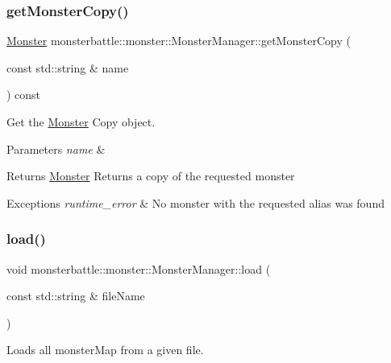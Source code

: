 \subsubsection{\texorpdfstring{get\+Monster\+Copy()}{getMonsterCopy()}}
{\footnotesize\ttfamily \hyperlink{classmonsterbattle_1_1monster_1_1Monster}{Monster} monsterbattle\+::monster\+::\+Monster\+Manager\+::get\+Monster\+Copy (\begin{DoxyParamCaption}\item[{const std\+::string \&}]{name }\end{DoxyParamCaption}) const}



Get the \hyperlink{classmonsterbattle_1_1monster_1_1Monster}{Monster} Copy object. 


\begin{DoxyParams}{Parameters}
{\em name} & \\
\hline
\end{DoxyParams}
\begin{DoxyReturn}{Returns}
\hyperlink{classmonsterbattle_1_1monster_1_1Monster}{Monster} Returns a copy of the requested monster
\end{DoxyReturn}

\begin{DoxyExceptions}{Exceptions}
{\em runtime\+\_\+error} & No monster with the requested alias was found \\
\hline
\end{DoxyExceptions}
\mbox{\label{classmonsterbattle_1_1monster_1_1MonsterManager_a48ee4cdd7559fd1d8686d9ba38f1008d}} 
\subsubsection{\texorpdfstring{load()}{load()}}
{\footnotesize\ttfamily void monsterbattle\+::monster\+::\+Monster\+Manager\+::load (\begin{DoxyParamCaption}\item[{const std\+::string \&}]{file\+Name }\end{DoxyParamCaption})}



Loads all monster\+Map from a given file. 


